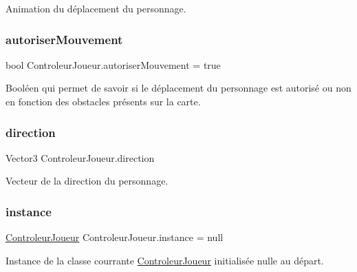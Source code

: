 Animation du déplacement du personnage. \mbox{\label{class_controleur_joueur_a590a9556e120874ec56fcea1b69601b0}} 
\subsubsection{\texorpdfstring{autoriser\+Mouvement}{autoriserMouvement}}
{\footnotesize\ttfamily bool Controleur\+Joueur.\+autoriser\+Mouvement = true\hspace{0.3cm}{\ttfamily [static]}}

Booléen qui permet de savoir si le déplacement du personnage est autorisé ou non en fonction des obstacles présents sur la carte. \mbox{\label{class_controleur_joueur_a54e1860c30d3fc26fe74a4caeb52c66b}} 
\subsubsection{\texorpdfstring{direction}{direction}}
{\footnotesize\ttfamily Vector3 Controleur\+Joueur.\+direction\hspace{0.3cm}{\ttfamily [private]}}

Vecteur de la direction du personnage. \mbox{\label{class_controleur_joueur_ac7deae3a66b01bb158a1920e47969925}} 
\subsubsection{\texorpdfstring{instance}{instance}}
{\footnotesize\ttfamily \mbox{\hyperlink{class_controleur_joueur}{Controleur\+Joueur}} Controleur\+Joueur.\+instance = null\hspace{0.3cm}{\ttfamily [static]}}

Instance de la classe courrante \mbox{\hyperlink{class_controleur_joueur}{Controleur\+Joueur}} initialisée nulle au départ. \mbox{\label{class_controleur_joueur_a6b328040f56d41178757fcc561bf9334}} 

